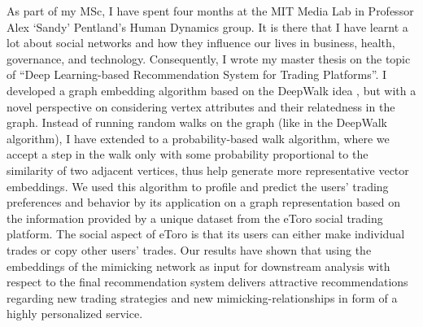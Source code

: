 As part of my MSc, I have spent four months at the MIT Media Lab in Professor Alex `Sandy' Pentland's Human Dynamics group. 
It is there that I have learnt a lot about social networks and how they influence our lives in business, health, governance, and technology. 
Consequently, I wrote my master thesis on the topic of ``Deep Learning-based Recommendation System for Trading Platforms''. 
I developed a graph embedding algorithm based on the DeepWalk idea \cite{perozzi2014deepwalk}, but with a novel perspective on considering vertex attributes and their relatedness in the graph. 
Instead of running random walks on the graph (like in the DeepWalk algorithm), I have extended to a probability-based walk algorithm, where we accept a step in the walk only with some probability proportional to the similarity of two adjacent vertices, thus help generate more representative vector embeddings. 
We used this algorithm to profile and predict the users' trading preferences and behavior by its application on a graph representation based on the information provided by a unique dataset from the eToro social trading platform. The social aspect of eToro is that its users can either make individual trades or copy other users' trades.
Our results have shown that using the embeddings of the mimicking network as input for downstream analysis with respect to the final recommendation system delivers attractive recommendations regarding new trading strategies and new mimicking-relationships in form of a highly personalized service.\\

